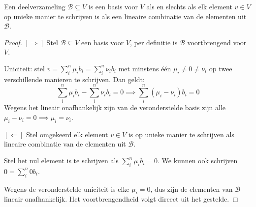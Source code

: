 \begin{stelling}[2.4.4]
    Een deelverzameling $\mathcal{B} \subseteq V$ is een basis voor $V$ als en slechts als elk element $v \in V$ op unieke manier te schrijven is als een lineaire combinatie van de elementen uit $\mathcal{B}$.
\end{stelling}
\begin{proof}
    \([\Rightarrow]\) Stel $\mathcal{B} \subseteq V$ een basis voor $V$, per definitie is \(\mathcal{B} \) voortbrengend voor \(V\).

    Uniciteit: stel \(v = \sum_{i}^{n} \mu_i b_i = \sum_{i}^{n} \nu_i b_i\) met minstens één \( \mu_i \neq 0 \neq \nu_i\) op twee verschillende manieren te schrijven.
    Dan geldt:
    \[
        \sum_{i}^{n} \mu_i b_i - \sum_{i}^{n} \nu_i b_i = 0
        \implies \sum_{i}^{n} (\mu_i-\nu_i)b_i = 0
    \]
    Wegens het lineair onafhankelijk zijn van de veronderstelde basis zijn alle \(\mu_i - \nu_i = 0 \implies \mu_i = \nu_i\).

    \([\Leftarrow]\) Stel omgekeerd elk element $v \in V$ is op unieke manier te schrijven als lineaire combinatie van de elementen uit $\mathcal{B}$.

    Stel het nul element is te schrijven als \(\sum_i^n \mu_i b_i = 0 \).
    We kunnen ook schrijven \(0 = \sum_i^n 0 b_i \).

    Wegens de veronderstelde uniciteit is elke \(\mu_i = 0\), dus zijn de elementen van \(\mathcal{B}\) lineair onafhankelijk.
    Het voortbrengendheid volgt direect uit het gestelde.
\end{proof}

